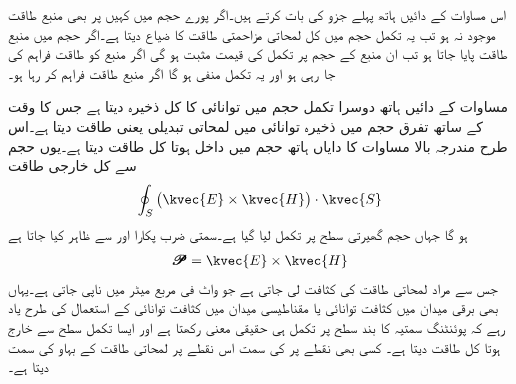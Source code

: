 اس مساوات کے دائیں ہاتھ پہلے جزو کی بات کرتے ہیں۔اگر پورے حجم میں کہیں پر بھی منبع طاقت موجود نہ ہو تب یہ تکمل حجم میں کل لمحاتی مزاحمتی طاقت  کا ضیاع دیتا ہے۔اگر حجم میں منبع طاقت پایا جاتا ہو تب ان منبع کے حجم  پر تکمل کی قیمت مثبت ہو گی اگر منبع کو طاقت فراہم کی جا رہی ہو اور یہ تکمل منفی ہو گا اگر منبع طاقت فراہم کر رہا ہو۔

مساوات کے دائیں ہاتھ دوسرا تکمل حجم میں توانائی کا کل ذخیرہ دیتا ہے جس کا وقت کے ساتھ تفرق حجم میں ذخیرہ توانائی میں لمحاتی تبدیلی یعنی طاقت دیتا ہے۔اس طرح مندرجہ بالا مساوات کا دایاں ہاتھ حجم میں داخل ہوتا کل طاقت دیتا ہے۔یوں حجم سے کل خارجی طاقت 
\begin{align*}
\oint_S \left(\kvec{E} \times \kvec{H} \right) \cdot \kvec{S}
\end{align*}
ہو گا جہاں حجم گھیرتی سطح پر تکمل لیا گیا ہے۔سمتی ضرب   پکارا اور  سے ظاہر کیا جاتا ہے
\begin{align}
\pmb{\mathscr{P}}=\kvec{E} \times \kvec{H}
\end{align}
جس سے مراد لمحاتی طاقت کی کثافت لی جاتی ہے جو واٹ فی مربع میٹر  میں ناپی جاتی ہے۔یہاں بھی برقی میدان میں کثافت توانائی  یا مقناطیسی میدان میں کثافت توانائی  کے استعمال کی طرح یاد رہے کہ پوئنٹنگ سمتیہ کا بند سطح پر  تکمل ہی حقیقی معنی رکھتا ہے اور ایسا تکمل سطح سے خارج ہوتا کل طاقت دیتا ہے۔ کسی بھی نقطے پر  کی سمت اس نقطے پر لمحاتی طاقت کے بہاو کی سمت دیتا ہے۔

